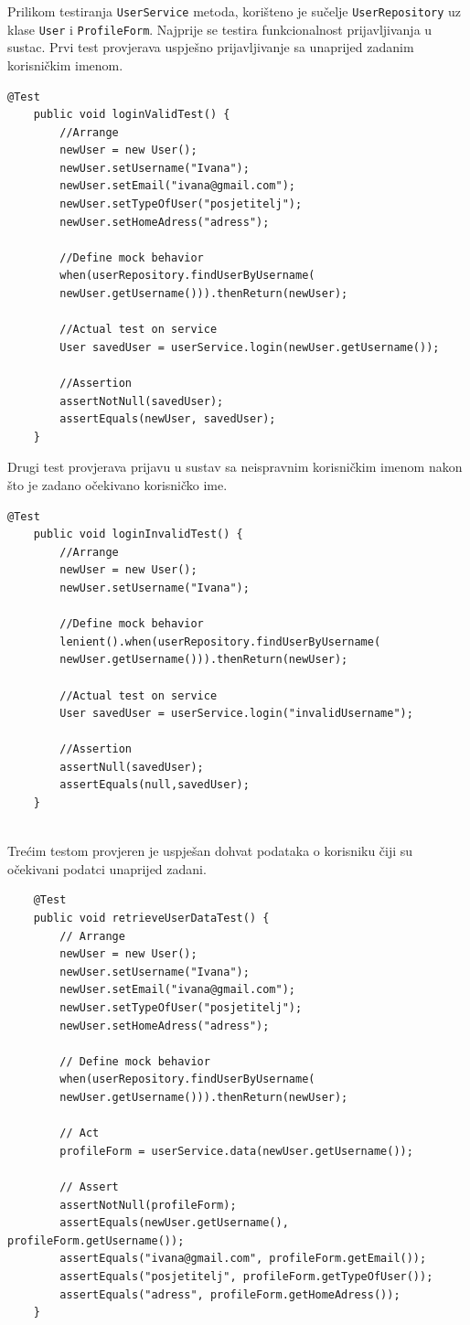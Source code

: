 			Prilikom testiranja \texttt{UserService} metoda, korišteno je sučelje \texttt{UserRepository} uz klase \texttt{User} i \texttt{ProfileForm}. Najprije se testira funkcionalnost prijavljivanja u sustac. Prvi test provjerava uspješno prijavljivanje sa unaprijed zadanim korisničkim imenom. 
			
			
\begin{lstlisting}[xleftmargin=0em]
	@Test
	public void loginValidTest() {
		//Arrange
		newUser = new User();
		newUser.setUsername("Ivana");
		newUser.setEmail("ivana@gmail.com");
		newUser.setTypeOfUser("posjetitelj");
		newUser.setHomeAdress("adress");
		
		//Define mock behavior
		when(userRepository.findUserByUsername(
		newUser.getUsername())).thenReturn(newUser);
		
		//Actual test on service
		User savedUser = userService.login(newUser.getUsername());
		
		//Assertion
		assertNotNull(savedUser);
		assertEquals(newUser, savedUser);
	}
\end{lstlisting}			

			Drugi test provjerava prijavu u sustav sa neispravnim korisničkim imenom nakon što je zadano očekivano korisničko ime. 

\begin{lstlisting}[xleftmargin=0em]
	@Test
	public void loginInvalidTest() {
		//Arrange
		newUser = new User();
		newUser.setUsername("Ivana");
		
		//Define mock behavior
		lenient().when(userRepository.findUserByUsername(
		newUser.getUsername())).thenReturn(newUser);
		
		//Actual test on service
		User savedUser = userService.login("invalidUsername");
		
		//Assertion
		assertNull(savedUser);
		assertEquals(null,savedUser);
	}
	
\end{lstlisting}			
			
			
			Trećim testom provjeren je uspješan dohvat podataka o korisniku čiji su očekivani podatci unaprijed zadani. 
			
\begin{lstlisting}
	@Test
	public void retrieveUserDataTest() {
		// Arrange
		newUser = new User();
		newUser.setUsername("Ivana");
		newUser.setEmail("ivana@gmail.com");
		newUser.setTypeOfUser("posjetitelj");
		newUser.setHomeAdress("adress");
		
		// Define mock behavior
		when(userRepository.findUserByUsername(
		newUser.getUsername())).thenReturn(newUser);
		
		// Act
		profileForm = userService.data(newUser.getUsername());
		
		// Assert
		assertNotNull(profileForm);
		assertEquals(newUser.getUsername(), profileForm.getUsername());
		assertEquals("ivana@gmail.com", profileForm.getEmail());
		assertEquals("posjetitelj", profileForm.getTypeOfUser());
		assertEquals("adress", profileForm.getHomeAdress());
	}
\end{lstlisting}
			
